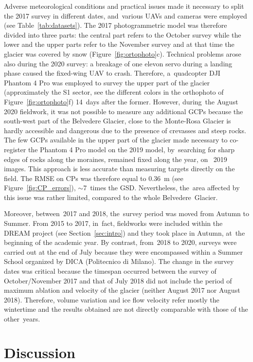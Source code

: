 Adverse meteorological conditions and practical issues made it necessary to split the
2017 survey in different dates, and~various UAVs and cameras were employed (see
Table~\ref{tab:datasets}).
The 2017 photogrammetric model was therefore divided into three parts: the central part
refers to the October survey while the lower and the upper parts refer to the November
survey and at that time the glacier was covered by snow (Figure~\ref{fig:ortophoto}c).
Technical problems arose also during the 2020 survey: a breakage of one elevon servo
during a landing phase caused the fixed-wing UAV to crash.
Therefore, a~quadcopter DJI Phantom 4 Pro was employed to survey the upper part of the
glacier (approximately the S1 sector, see the different colors in the orthophoto of
Figure~\ref{fig:ortophoto}f) \SI{14}{days} after the former.
However, during~the August 2020 fieldwork, it was not possible to measure any additional
GCPs because the south-west part of the Belvedere Glacier, close to the Monte-Rosa
Glacier is hardly accessible and dangerous due to the presence of crevasses and steep
rocks.
The few GCPs available in the upper part of the glacier made necessary to co-register the
Phantom 4 Pro model on the 2019 model, by~searching for sharp edges of rocks along the
moraines, remained fixed along the year, on~ 2019 images.
This approach is less accurate than measuring targets directly on the field.
The RMSE on CPs was therefore equal to \SI{0.36}{\meter} (see
Figure~\ref{fig:CP_errors}), $\sim$7~times the GSD.
Nevertheless, the~area affected by this issue was rather limited, compared to the whole
Belvedere~Glacier.

Moreover, between~2017 and 2018, the~survey period was moved from Autumn to Summer.
From 2015 to 2017, in~fact, fieldworks were included within the DREAM project (see
Section~\ref{sec:intro}) and they took place in Autumn, at~the beginning of the academic
year.
By contrast, from~2018 to 2020, surveys were carried out at the end of July because they
were encompassed within a Summer School organized by DICA (Politecnico di Milano).
The change in the survey dates was critical because the timespan occurred between the
survey of October/November 2017 and that of July 2018 did not include the period of
maximum ablation and velocity of the glacier (neither August 2017 nor August 2018).
Therefore, volume variation and ice flow velocity refer mostly the wintertime and the
results obtained are not directly comparable with those of the other~years.

\section{Discussion}

